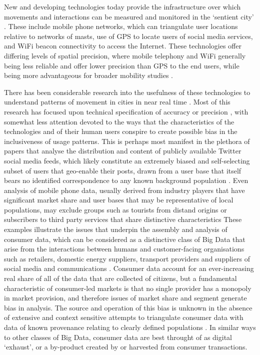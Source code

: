 New and developing technologies today provide the infrastructure over which movements and interactions can be measured and monitored in the `sentient city' \citep{amin2017seeing}.
These include mobile phone networks, which can triangulate user locations relative to networks of masts, use of GPS to locate users of social media services, and WiFi beacon connectivity to access the Internet.
These technologies offer differing levels of spatial precision, where mobile telephony and WiFi generally being less reliable and offer lower precision than GPS to the end users, while being more advantageous for broader mobility studies \citep{pinelli2015comparing}.

There has been considerable research into the usefulness of these technologies to understand patterns of movement in cities in near real time \citep{candia2008uncovering, gonzalez2008understanding, calabrese2013understanding}. Most of this research has focused upon technical specification of accuracy or precision \citep{song2010limits, lane2010survey}, with somewhat less attention devoted to the ways that the characteristics of the technologies and of their human users conspire to create possible bias in the inclusiveness of usage patterns.
This is perhaps most manifest in the plethora of papers that analyse the distribution and content of publicly available Twitter social media feeds, which likely constitute an extremely biased and self-selecting subset of users that geo-enable their posts, drawn from a user base that itself bears no identified correspondence to any known background population \citep{lansley2016deriving}. 
Even analysis of mobile phone data, usually derived from industry players that have significant market share and user bases that may be representative of local populations, may exclude groups such as tourists from distand origins or subscribers to third party services that share distinctive characteristics \citep{di2016mind}
These examples illustrate the issues that underpin the assembly and analysis of consumer data, which can be considered as a distinctive class of Big Data that arise from the interactions between humans and customer-facing organisations such as retailers, domestic energy suppliers, transport providers and suppliers of social media and communications \citep{cdrc2018consumer}.
Consumer data account for an ever-increasing real share of all of the data that are collected of citizens, but a fundamental characteristic of consumer-led markets is that no single provider has a monopoly in market provision, and therefore issues of market share and segment generate bias in analysis.
The source and operation of this bias is unknown in the absence of extensive and context sensitive attempts to triangulate consumer data with data of known provenance relating to clearly defined populations \citep{lansley2016deriving}.
In similar ways to other classes of Big Data, consumer data are best throught of as digital ‘exhaust’, or a by-product created by or harvested from consumer transactions.

